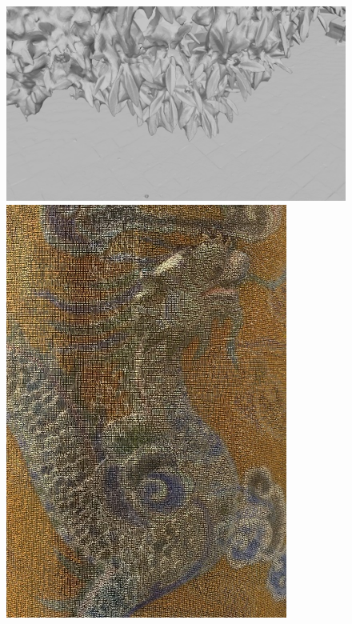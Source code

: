 \documentclass[10pt,twocolumn,letterpaper]{article}
\begin{document}
\begin{figure}
\begin{minipage}[b]{0.30\linewidth}
        \begin{minipage}[b]{\linewidth}
            \includegraphics[width=\textwidth]{images/figures/results/tomb_lidar/leaves_mesh.jpg}
        \end{minipage}
        \begin{minipage}[b]{0.48\linewidth}
            \includegraphics[width=\textwidth]{images/figures/results/tomb_lidar/dragon_cloud_min.jpg}

\end{minipage}
\end{minipage}
\end{figure}
\end{document}

